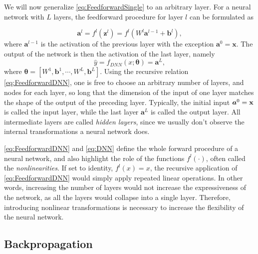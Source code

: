 We will now generalize \cref{eq:FeedforwardSingle} to an arbitrary layer. For a neural network with $L$ layers, the feedforward procedure for layer $l$ can be formulated as 

\begin{equation}\label{eq:FeedforwardDNN}
    \boldsymbol{a}^l = f^l(\boldsymbol{z}^l) = f^l(W^l \boldsymbol{a}^{l-1} + \boldsymbol{b}^l),
\end{equation}
where $\boldsymbol{a}^{l-1}$ is the activation of the previous layer with the exception $\boldsymbol{a}^{0} = \boldsymbol{x}$. The output of the network is then the activation of the last layer, namely 
\begin{equation}\label{eq:DNN}
    \hat{y} = f_{DNN}(x;\boldsymbol{\theta}) = \boldsymbol{a}^{L},
\end{equation}
where $\boldsymbol{\theta} = [W^1, \boldsymbol{b}^1, \cdots, W^L,  \boldsymbol{b}^L]$. Using the recursive relation \cref{eq:FeedforwardDNN}, one is free to choose an arbitrary number of layers, and nodes for each layer, so long that the dimension of the input of one layer matches the shape of the output of the preceding layer. Typically, the initial input $\boldsymbol{a}^0 = \bold{x}$ is called the input layer, while the last layer $\boldsymbol{a}^L$ is called the output layer. All intermediate layers are called \emph{hidden layers}, since we usually don't observe the internal transformations a neural network does. 

\cref{eq:FeedforwardDNN} and \cref{eq:DNN} define the whole forward procedure of a neural network, and also highlight the role of the functions $f^l(\cdot)$, often called the \emph{nonlinearities}. If set to identity, $f^l(x) = x$, the recursive application of \cref{eq:FeedforwardDNN} would simply apply repeated linear operations. In other words, increasing the number of layers would not increase the expressiveness of the network, as all the layers would collapse into a single layer. Therefore, introducing nonlinear transformations is necessary to increase the flexibility of the neural network. 

\subsection{Backpropagation}\label{sec:BackpropogationDNN}



